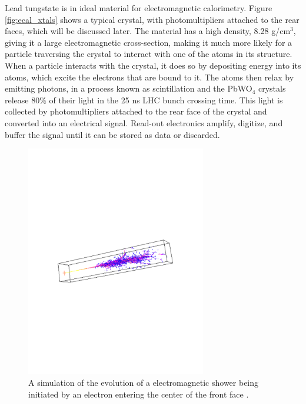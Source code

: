 \par Lead tungstate is in ideal material for electromagnetic
calorimetry.  Figure \ref{fig:ecal_xtals} shows a typical crystal,
with photomultipliers attached to the rear faces, which will be
discussed later.  The material has a high density, 8.28 g/cm$^{3}$, giving it a
large electromagnetic cross-section, making it much more likely for a
particle traversing the crystal to interact with one of the atoms in
its structure.  When a particle interacts with the crystal, it does so
by depositing energy into its atoms, which excite the electrons that
are bound to it.  The atoms then relax by emitting photons, in a
process known as scintillation and the PbWO$_{4}$ crystals release
80$\%$ of their light in the 25 ns LHC bunch crossing time.  This
light is collected by photomultipliers attached to the rear face of
the crystal and converted into an electrical signal.  Read-out
electronics amplify, digitize, and buffer the signal until it can be
stored as data or discarded.  

\begin{figure}[h]
   \centering
  \includegraphics[width=0.7\textwidth]{Figures/CMS_Diagrams/ECAL__shower_simulation.pdf}
  \caption{A simulation of the evolution of a electromagnetic shower
    being initiated by an electron entering the center of the front
    face \cite{CMS:ecal_crystal_shower_simulation}. } \label{fig:ecal_shower}
\end{figure}

